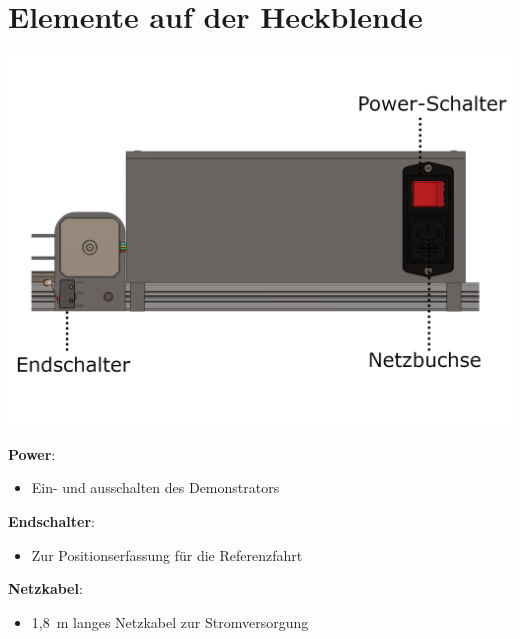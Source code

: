 %
%

\chapter{Elemente auf der Heckblende}
\begin{center}
	
	\includegraphics[width=\textwidth]{Images/Konstruktion3.png}
\end{center}

\textbf{Power}: 
\begin{itemize}
	\item Ein- und ausschalten des Demonstrators
\end{itemize}

\textbf{Endschalter}: 
\begin{itemize}
	\item Zur Positionserfassung für die Referenzfahrt
\end{itemize}

\textbf{Netzkabel}: 
\begin{itemize}
	\item 1,8\ m langes Netzkabel zur Stromversorgung
\end{itemize}

